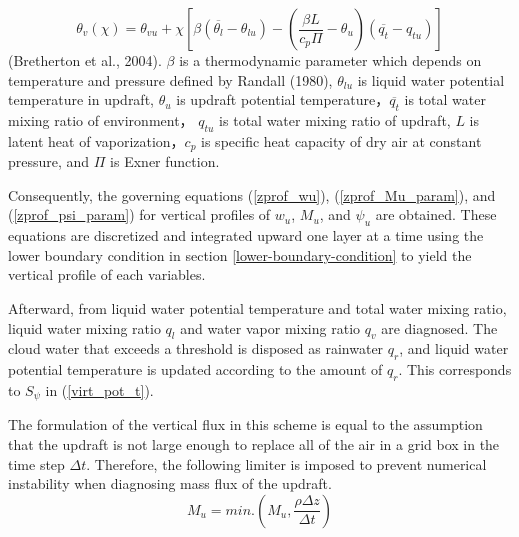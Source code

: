 \documentclass[platex, dvipdfmx]{article}
\begin{document}
\begin{equation}\label{virt_pot_t}
    \theta_v(\chi)=\theta_{vu}+\chi\left[ \beta(\overline{\theta_l}-\theta_{lu})-\left(\frac{\beta L}{c_p\Pi}-\theta_u\right)(\overline{q_t}-q_{tu})\right]   
\end{equation}
(Bretherton et al., 2004). $\beta$ is a thermodynamic parameter which depends on temperature and pressure defined by Randall (1980), 
$\theta_{lu}$ is liquid water potential temperature in updraft, $\theta_u$ is updraft potential temperature，$\overline{q_t}$ is total water mixing ratio of environment，
$q_{tu}$ is total water mixing ratio of updraft, $L$ is latent heat of vaporization，$c_p$ is specific heat capacity of dry air at constant pressure, and $\Pi$ is Exner function.

Consequently, the governing equations (\ref{zprof_wu}), (\ref{zprof_Mu_param}), and (\ref{zprof_psi_param}) for vertical profiles of $w_u$, $M_u$, and $\psi_u$ are obtained.
These equations are discretized and integrated upward one layer at a time using the lower boundary condition in section \ref{lower-boundary-condition} to yield the vertical profile of each variables.

Afterward, from liquid water potential temperature and total water mixing ratio, liquid water mixing ratio $q_l$ and water vapor mixing ratio $q_v$ are diagnosed.
The cloud water that exceeds a threshold is disposed as rainwater $q_r$, and liquid water potential temperature is updated according to the amount of $q_r$. This corresponds to $S_\psi$ in (\ref{virt_pot_t}).

The formulation of the vertical flux in this scheme is equal to the assumption that the updraft is not large enough to replace all of the air in a grid box in the time step $\Delta t$.
Therefore, the following limiter is imposed to prevent numerical instability when diagnosing mass flux of the updraft.
\begin{equation}\label{Mu_limit}
    M_u = min.\left(M_u, \frac{\rho\Delta z}{\Delta t}\right)    
\end{equation}
\end{document}
